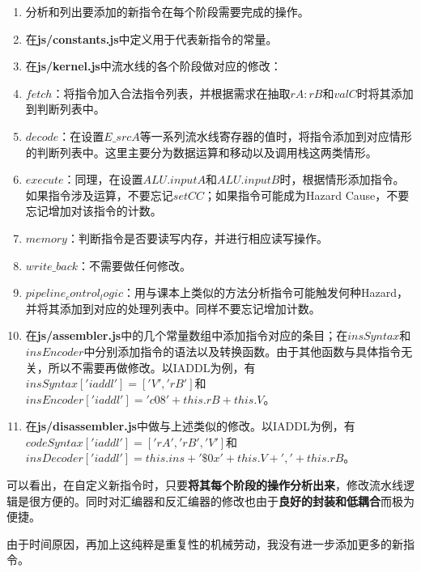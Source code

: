\begin{enumerate}
\item 分析和列出要添加的新指令在每个阶段需要完成的操作。
\item 在{\bf js/constants.js}中定义用于代表新指令的常量。
\item 在{\bf js/kernel.js}中流水线的各个阶段做对应的修改：
\item $fetch$：将指令加入合法指令列表，并根据需求在抽取$rA:rB$和$valC$时将其添加到判断列表中。
\item $decode$：在设置$E\_srcA$等一系列流水线寄存器的值时，将指令添加到对应情形的判断列表中。这里主要分为数据运算和移动以及调用栈这两类情形。
\item $execute$：同理，在设置$ALU.inputA$和$ALU.inputB$时，根据情形添加指令。如果指令涉及运算，不要忘记$setCC$；如果指令可能成为Hazard Cause，不要忘记增加对该指令的计数。
\item $memory$：判断指令是否要读写内存，并进行相应读写操作。
\item $write\_back$：不需要做任何修改。
\item $pipeline_control_logic$：用与课本上类似的方法分析指令可能触发何种Hazard，并将其添加到对应的处理列表中。同样不要忘记增加计数。
\item 在{\bf js/assembler.js}中的几个常量数组中添加指令对应的条目；在$insSyntax$和$insEncoder$中分别添加指令的语法以及转换函数。由于其他函数与具体指令无关，所以不需要再做修改。以IADDL为例，有$insSyntax['iaddl'] = ['V', 'rB']$和$insEncoder['iaddl'] = 'c08' + this.rB + this.V$。
\item 在{\bf js/disassembler.js}中做与上述类似的修改。以IADDL为例，有$codeSyntax['iaddl'] = ['rA', 'rB', 'V']$和$insDecoder['iaddl'] = this.ins + ' \$0x' + this.V + ', ' + this.rB$。
\end{enumerate}

可以看出，在自定义新指令时，只要{\bf 将其每个阶段的操作分析出来}，修改流水线逻辑是很方便的。同时对汇编器和反汇编器的修改也由于{\bf 良好的封装和低耦合}而极为便捷。

由于时间原因，再加上这纯粹是重复性的机械劳动，我没有进一步添加更多的新指令。